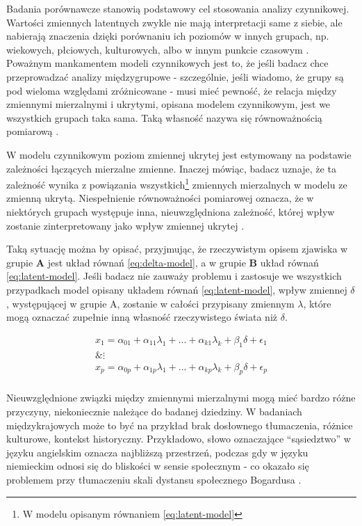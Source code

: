 \documentclass[12pt]{article}
\begin{document}
Badania porównawcze stanowią podstawowy cel stosowania analizy czynnikowej. Wartości zmiennych latentnych zwykle nie mają interpretacji same z siebie, ale nabierają znaczenia dzięki porównaniu ich poziomów w innych grupach, np. wiekowych, płciowych, kulturowych, albo w innym punkcie czasowym \citep{Pokropek}. Poważnym mankamentem modeli czynnikowych jest to, że jeśli badacz chce przeprowadzać analizy międzygrupowe - szczególnie, jeśli wiadomo, że grupy są pod wieloma względami zróżnicowane - musi mieć pewność, że relacja między zmiennymi mierzalnymi i ukrytymi, opisana modelem czynnikowym, jest we wszystkich grupach taka sama. Taką własność nazywa się równoważnością pomiarową \citep{ChenEtAl}.

W modelu czynnikowym poziom zmiennej ukrytej jest estymowany na podstawie zależności łączących mierzalne zmienne. Inaczej mówiąc, badacz uznaje, że ta zależność wynika z powiązania wszystkich\footnote{W modelu opisanym równaniem \ref{eq:latent-model}} zmiennych mierzalnych w modelu ze zmienną ukrytą. Niespełnienie równoważności pomiarowej oznacza, że w niektórych grupach występuje inna, nieuwzględniona zależność, której wpływ zostanie zinterpretowany jako wpływ zmiennej ukrytej \citep{HirBra}.

Taką sytuację można by opisać, przyjmując, że rzeczywistym opisem zjawiska w grupie \textbf{A} jest układ równań \ref{eq:delta-model}, a w grupie \textbf{B} układ równań \ref{eq:latent-model}. Jeśli badacz nie zauważy problemu i zastosuje we wszystkich przypadkach model opisany układem równań \ref{eq:latent-model}, wpływ zmiennej \(\delta\), występującej w grupie A, zostanie w całości przypisany zmiennym \(\lambda\), które mogą oznaczać zupełnie inną własność rzeczywistego świata niż \(\delta\).

\begin{equation}
\label{eq:delta-model}
\begin{aligned} 
x_1 = \alpha_{01} + \alpha_{11} \lambda_1 + ... + \alpha_{k1} \lambda_k + \beta_1 \delta + \epsilon_1\\
\& \vdots \\
x_p = \alpha_{0p} + \alpha_{1p} \lambda_1 + ... + \alpha_{kp} \lambda_k + \beta_p \delta + \epsilon_p\\
\end{aligned}
\end{equation}

Nieuwzględnione związki między zmiennymi mierzalnymi mogą mieć bardzo różne przyczyny, niekoniecznie należące do badanej dziedziny. W badaniach międzykrajowych może to być na przykład brak dosłownego tłumaczenia, różnice kulturowe, kontekst historyczny. Przykładowo, słowo oznaczające ``sąsiedztwo'' w języku angielskim oznacza najbliższą przestrzeń, podczas gdy w języku niemieckim odnosi się do bliskości w sensie społecznym - co okazało się problemem przy tłumaczeniu skali dystansu społecznego Bogardusa \citep{Pokropek}.
\end{document}
